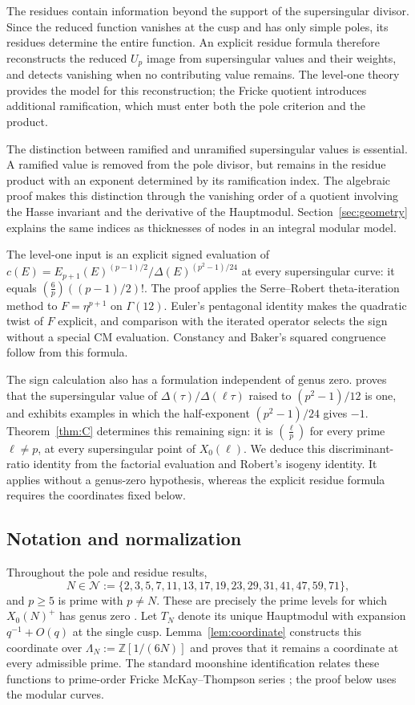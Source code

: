 \documentclass[11pt,a4paper]{article}
\numberwithin{equation}{section}
\theoremstyle{definition}
\theoremstyle{remark}
\newcommand{\Z}{\mathbb Z}
\begin{document}
The residues contain information beyond the support of the supersingular divisor.
Since the reduced function vanishes at the cusp and has only simple poles, its
residues determine the entire function. An explicit residue formula therefore
reconstructs the reduced $U_p$ image from supersingular values and their weights,
and detects vanishing when no contributing value remains. The level-one theory
provides the model for this reconstruction; the Fricke quotient introduces
additional ramification, which must enter both the pole criterion and the product.

The distinction between ramified and unramified supersingular values is essential.
A ramified value is removed from the pole divisor, but remains in the residue
product with an exponent determined by its ramification index. The algebraic proof
makes this distinction through the vanishing order of a quotient involving the Hasse
invariant and the derivative of the Hauptmodul. Section~\ref{sec:geometry} explains
the same indices as thicknesses of nodes in an integral modular model.

The level-one input is an explicit signed evaluation of
$c(E)=E_{p+1}(E)^{(p-1)/2}/\Delta(E)^{(p^2-1)/24}$ at every supersingular
curve: it equals $\left(\frac6p\right)((p-1)/2)!$. The proof applies the
Serre--Robert theta-iteration method to $F=\eta^{p+1}$ on $\Gamma(12)$.
Euler's pentagonal identity makes the quadratic twist of $F$ explicit,
and comparison with the iterated operator selects the sign without a
special CM evaluation. Constancy and Baker's squared congruence follow
from this formula.

The sign calculation also has a formulation independent of genus zero.
\citet[Theorem~1.2 and Remark~4]{Ono25} proves that the supersingular value of
$\Delta(\tau)/\Delta(\ell\tau)$ raised to $(p^2-1)/12$ is one, and exhibits
examples in which the half-exponent $(p^2-1)/24$ gives $-1$.
Theorem~\ref{thm:C} determines this remaining sign: it is
$\left(\frac{\ell}{p}\right)$ for every prime $\ell\ne p$, at every
supersingular point of $X_0(\ell)$. We deduce this discriminant-ratio
identity from the factorial evaluation and Robert's isogeny identity.
It applies without a genus-zero hypothesis, whereas the explicit residue
formula requires the coordinates fixed below.

\subsection{Notation and normalization}
Throughout the pole and residue results,
\[
N\in\mathcal N:=\{2,3,5,7,11,13,17,19,23,29,31,41,47,59,71\},
\]
and $p\ge5$ is prime with $p\ne N$.
These are precisely the prime levels for which $X_0(N)^+$ has genus
zero \citep[\S3, Corollary]{Ogg75}. Let $T_N$ denote its unique
Hauptmodul with expansion $q^{-1}+O(q)$ at the single cusp.
Lemma~\ref{lem:coordinate} constructs this coordinate over
$\Lambda_N:=\Z[1/(6N)]$ and proves that it remains a coordinate
at every admissible prime. The standard moonshine identification
relates these functions to prime-order Fricke McKay--Thompson series
\citep{CN79,CMT19}; the proof below uses the modular curves.
\end{document}
